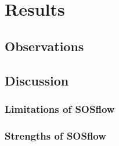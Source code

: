 
\section{Results} %
\subsection{Observations}
%
%
\subsection{Discussion}
%
%
\subsubsection{Limitations of SOSflow}
%
%

\subsubsection{Strengths of SOSflow}
%
%




